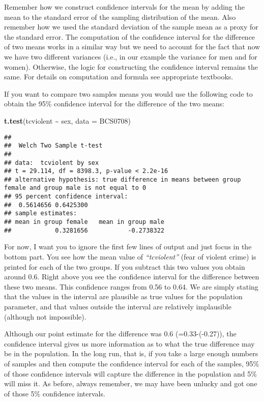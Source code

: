 \documentclass[
]{book}
\newenvironment{Shaded}{\begin{snugshade}}{\end{snugshade}}
\newcommand{\AttributeTok}[1]{\textcolor[rgb]{0.13,0.29,0.53}{#1}}
\newcommand{\FunctionTok}[1]{\textcolor[rgb]{0.13,0.29,0.53}{\textbf{#1}}}
\newcommand{\NormalTok}[1]{#1}
\newcommand{\SpecialCharTok}[1]{\textcolor[rgb]{0.81,0.36,0.00}{\textbf{#1}}}
\begin{document}
Remember how we construct confidence intervals for the mean by adding the mean to the standard error of the sampling distribution of the mean. Also remember how we used the standard deviation of the sample mean as a proxy for the standard error. The computation of the confidence interval for the difference of two means works in a similar way but we need to account for the fact that now we have two different variances (i.e., in our example the variance for men and for women). Otherwise, the logic for constructing the confidence interval remains the same. For details on computation and formula see appropriate textbooks.

If you want to compare two samples means you would use the following code to obtain the 95\% confidence interval for the difference of the two means:

\begin{Shaded}
\begin{Highlighting}[]
\FunctionTok{t.test}\NormalTok{(tcviolent }\SpecialCharTok{\textasciitilde{}}\NormalTok{ sex, }\AttributeTok{data =}\NormalTok{ BCS0708)}
\end{Highlighting}
\end{Shaded}

\begin{verbatim}
## 
##  Welch Two Sample t-test
## 
## data:  tcviolent by sex
## t = 29.114, df = 8398.3, p-value < 2.2e-16
## alternative hypothesis: true difference in means between group female and group male is not equal to 0
## 95 percent confidence interval:
##  0.5614656 0.6425300
## sample estimates:
## mean in group female   mean in group male 
##            0.3281656           -0.2738322
\end{verbatim}

For now, I want you to ignore the first few lines of output and just focus in the bottom part. You see how the mean value of \emph{``tcviolent''} (fear of violent crime) is printed for each of the two groups. If you subtract this two values you obtain around 0.6. Right above you see the confidence interval for the difference between these two means. This confidence ranges from 0.56 to 0.64. We are simply stating that the values in the interval are plausible as true values for the population parameter, and that values outside the interval are relatively implausible (although not impossible).

Although our point estimate for the difference was 0.6 (=0.33-(-0.27)), the confidence interval gives us more information as to what the true difference may be in the population. In the long run, that is, if you take a large enough numbers of samples and then compute the confidence interval for each of the samples, 95\% of those confidence intervals will capture the difference in the population and 5\% will miss it. As before, always remember, we may have been unlucky and got one of those 5\% confidence intervals.
\end{document}
